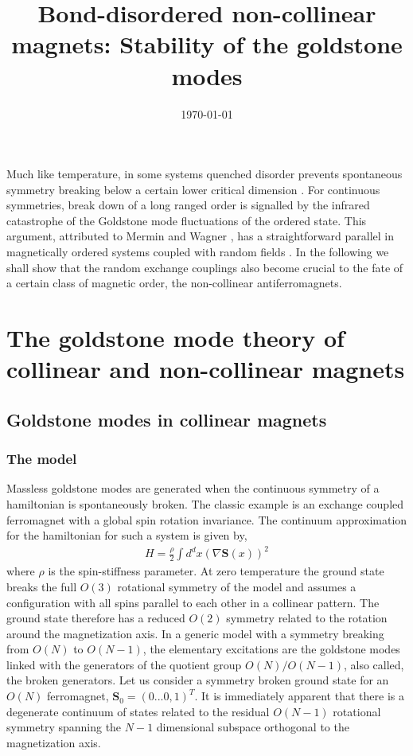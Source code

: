 \documentclass[notitlepage,onecolumn,showpacs,11pt]{revtex4-1}
\newcommand{\mbf}[1]{\mathbf{#1}}
\begin{document}
\title{Bond-disordered non-collinear magnets: Stability of the goldstone modes}

\date{\today}

\maketitle

Much like temperature, in some systems quenched disorder prevents spontaneous 
symmetry breaking below a certain lower critical dimension \cite{imry-ma-75}. 
For continuous symmetries, break down of a long ranged order is signalled by 
the infrared catastrophe of the Goldstone mode fluctuations of the ordered state. 
This argument, attributed to Mermin and Wagner \cite{mermin-wagner-66}, has a 
straightforward parallel in magnetically ordered systems coupled with random 
fields \cite{aharony-78}.  In the following we shall show that the random 
exchange couplings also become crucial to the fate of a certain class of magnetic 
order, the non-collinear antiferromagnets.

\section{The goldstone mode theory of collinear and non-collinear magnets}

\subsection{Goldstone modes in collinear magnets}

\subsubsection{The model}

Massless goldstone modes are generated when the continuous symmetry of a hamiltonian
is spontaneously broken. The classic example is an exchange coupled ferromagnet with 
a global spin rotation invariance. The continuum approximation for the hamiltonian 
for such a system is given by, 
\begin{equation}
    \begin{aligned}
        H = \frac{\rho}{2}\int d^dx 
        \left(\nabla\mbf{S}(x)\right)^2
    \end{aligned}
\end{equation}
where $\rho$ is the spin-stiffness parameter. At zero temperature the ground state 
breaks the full $O(3)$ rotational symmetry of the model and assumes a configuration 
with all spins parallel to each other in a collinear pattern. The ground state 
therefore has a reduced $O(2)$ symmetry related to the rotation around the magnetization 
axis. In a generic model with a symmetry breaking from $O(N)$ to $O(N-1)$, the elementary 
excitations are the goldstone modes linked with the generators of the quotient group 
$O(N)/O(N-1)$, also called, the broken generators. Let us consider a symmetry broken 
ground state for an $O(N)$ ferromagnet, $\mbf{S}_0 = \left(0 ... 0, 1\right)^T $. It is
immediately apparent that there is a degenerate continuum of states related to the 
residual $O(N-1)$ rotational symmetry spanning the $N-1$ dimensional subspace orthogonal 
to the magnetization axis.
\end{document}
